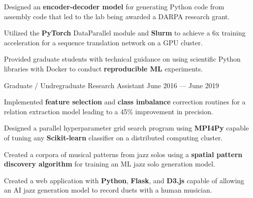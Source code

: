 \begin{cventries}
{\begin{cvitems}
        \item Designed an \textbf{encoder-decoder model} for generating Python  code from assembly code that led to the lab being awarded a DARPA research grant.
        \item Utilized the \textbf{PyTorch} DataParallel module and \textbf{Slurm} to achieve a 6x training acceleration for a sequence translation network on a GPU cluster.
        \item Provided graduate students with technical guidance on using scientific Python libraries with Docker to conduct \textbf{reproducible ML} experiments.
      \end{cvitems}
    }
    \vspace{.07cm}
  \cventry
    {Graduate / Undregraduate Research Assistant} %
    {} %
    {} %
    {June 2016 --- June 2019} %
    {
      \vspace{-0.1cm}
      \begin{cvitems} %
        \item Implemented \textbf{feature selection} and \textbf{class imbalance} correction routines for a relation extraction model leading to a 45\% improvement in precision.
        \item Designed a parallel hyperparameter grid search program using \textbf{MPI4Py} capable of tuning any \textbf{Scikit-learn} classifier on a distributed computing cluster.
        \item Created a corpora of musical patterns from jazz solos using a \textbf{spatial pattern discovery algorithm} for training an ML jazz solo generation model.
        \item Created a web application with \textbf{Python}, \textbf{Flask}, and \textbf{D3.js} capable of allowing an AI jazz generation model to record duets with a human musician.

\end{cvitems}}
\end{cventries}
